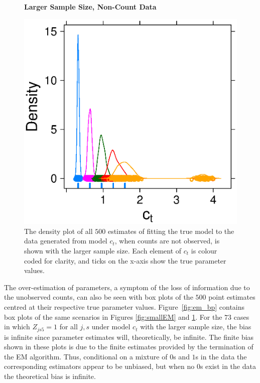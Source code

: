 \documentclass[smallextended]{svjour3}
\begin{document}
\begin{figure}
  \textbf{Larger Sample Size, Non-Count Data}\par
  \centering
  \includegraphics[scale=0.75]{largerEM}
  \caption{The density plot of all $500$ estimates of fitting the true model to the data generated from model $c_t$, when counts are not observed, is shown with the larger sample size.  Each element of $c_t$ is colour coded for clarity, and ticks on the x-axis show the true parameter values.}
  \label{fig:largerEM}
\end{figure}

The over-estimation of parameters, a symptom of the loss of information due to the unobserved counts, can also be seen with box plots of the $500$ point estimates centred at their respective true parameter values.  Figure~\ref{fig:em_bp} contains box plots of the same scenarios in Figures \ref{fig:smallEM} and \ref{fig:largerEM}.  For the $73$ cases in which $Z_{js5} = 1$ for all $j,s$ under model $c_t$ with the larger sample size, the bias is infinite since parameter estimates will, theoretically, be infinite.  The finite bias shown in these plots is due to the finite estimates provided by the termination of the EM algorithm.  Thus, conditional on a mixture of $0$s and $1$s in the data the corresponding estimators appear to be unbiased, but when no $0$s exist in the data the theoretical bias is infinite.  
\end{document}
